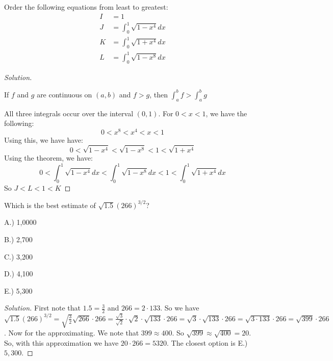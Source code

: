 \documentclass[crop=false,class=book,oneside]{standalone}
\begin{document}
\begin{problem}
Order the following equations from least to greatest:
\begin{align*}
    I&=1\\
    J&=\int_{0}^{1}\sqrt{1-x^{4}}dx\\
    K&=\int_{0}^{1}\sqrt{1+x^{4}}dx\\
    L&=\int_{0}^{1}\sqrt{1-x^{8}}dx
\end{align*}
\end{problem}
\begin{proof}[Solution]
\begin{theorem*}
If $f$ and $g$ are continuous on $(a,b)$ and $f>g$, then $\int_{a}^{b}f>\int_{a}^{b}g$
\end{theorem*}
All three integrals occur over the interval $(0,1)$. For $0 < x < 1$, we have the following:
\begin{equation*}
    0<x^{8}<x^{4}<x<1
\end{equation*}
Using this, we have have:
\begin{equation*}
    0<\sqrt{1-x^{4}}<\sqrt{1-x^{8}}<1<\sqrt{1+x^{4}}
\end{equation*}
Using the theorem, we have:
\begin{equation*}
    0<\int_{0}^{1}\sqrt{1-x^4}dx<\int_{0}^{1}\sqrt{1-x^8}dx<1<\int_{0}^{1}\sqrt{1+x^4}dx
\end{equation*}
So $J<L<1<K$
\end{proof}
\begin{problem}
Which is the best estimate of $\sqrt{1.5}(266)^{3/2}$?
\begin{enumerate}
    \begin{multicols}{5}
    \item[A.)] 1,0000
    \item[B.)] 2,700
    \item[C.)] 3,200
    \item[D.)] 4,100
    \item[E.)] 5,300
    \end{multicols}
\end{enumerate}
\end{problem}
\begin{proof}[Solution]
First note that $1.5 = \frac{3}{2}$ and $266 = 2\cdot 133$. So we have $\sqrt{1.5}(266)^{3/2} = \sqrt{\frac{3}{2}}\sqrt{266}\cdot 266 = \frac{\sqrt{3}}{\sqrt{2}}\cdot \sqrt{2}\cdot \sqrt{133}\cdot 266 = \sqrt{3}\cdot \sqrt{133}\cdot 266 = \sqrt{3\cdot 133}\cdot 266 = \sqrt{399}\cdot 266$. Now for the approximating. We note that $399 \approx 400$. So $\sqrt{399} \approx \sqrt{400} = 20$. So, with this approximation we have $20\cdot 266 = 5320$. The closest option is E.) $5,300$.
\end{proof}
\end{document}

